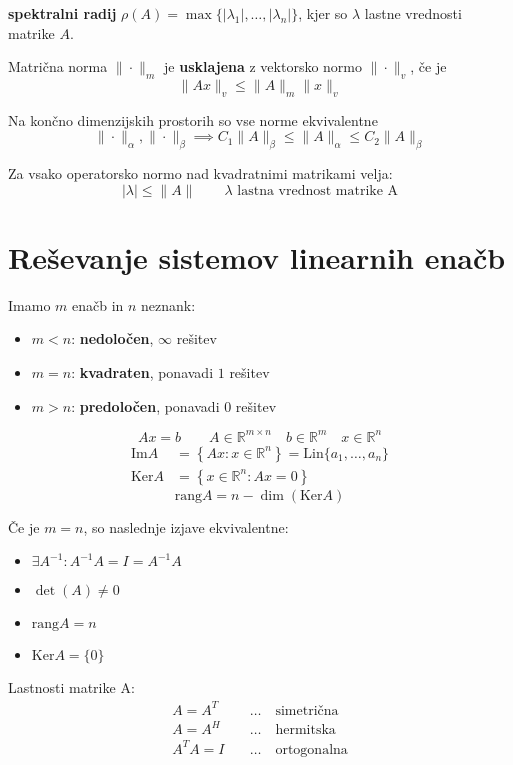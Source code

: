 \begin{multicols}{4}
\textbf{spektralni radij} $\rho(A) = \max\{ |\lambda_1|, \dots, |\lambda_n| \}$, kjer so $\lambda$ lastne vrednosti matrike $A$.

Matrična norma $\| \cdot \|_m$ je \textbf{usklajena} z vektorsko normo $\|\cdot \|_v$, če je
\[ \| Ax \|_v \leq \| A \|_m \| x \|_v \]


Na končno dimenzijskih prostorih so vse norme ekvivalentne
\[ \| \cdot \|_\alpha, \| \cdot \|_\beta \implies C_1 \| A \|_\beta \leq \| A \|_\alpha \leq C_2 \| A \|_\beta \]

Za vsako operatorsko normo nad kvadratnimi matrikami velja:
\[ |\lambda | \leq \|A\| \qquad \lambda \text{ lastna vrednost matrike A}\]

\section{Reševanje sistemov linearnih enačb}
Imamo $m$ enačb in $n$ neznank:
\begin{itemize}
	\item $m < n$: \textbf{nedoločen}, $\infty$ rešitev
	\item $m = n$: \textbf{kvadraten}, ponavadi $1$ rešitev
	\item $m > n$: \textbf{predoločen}, ponavadi $0$ rešitev
\end{itemize}

\[ A x = b \qquad A \in \mathbb{R}^{m \times n} \quad b \in \mathbb{R}^m  \quad x \in \mathbb{R}^n\]
\begin{align*}
	\text{Im}A &= \left\{ Ax : x \in \mathbb{R}^n \right\} = \text{Lin}\{a_1, \dots, a_n\} \\
	\text{Ker}A &= \left\{ x \in \mathbb{R}^n : Ax = 0 \right\}
\end{align*}
\[ \text{rang}A = n - \dim (\text{Ker}A)\]

Če je $m=n$, so naslednje izjave ekvivalentne:
\begin{itemize}
	\item $\exists A^{-1}: A^{-1} A = I = A^{-1}A$
	\item $\det(A) \neq 0$
	\item $\text{rang}A = n$
	\item $\text{Ker}A = \{0\}$
\end{itemize}

Lastnosti matrike A:
\begin{align*}
	A = A^T & \quad \dots \quad \text{simetrična} \\
	A = A^H & \quad \dots \quad \text{hermitska} \\
	A^T A = I & \quad \dots \quad \text{ortogonalna}
\end{align*}


\end{multicols}
